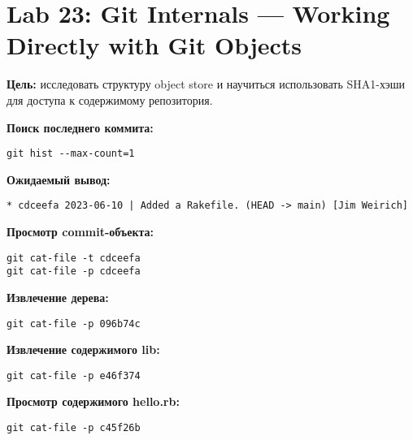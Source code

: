 \documentclass[a4paper,12pt]{report}
\begin{document}

\section{Lab 23: Git Internals — Working Directly with Git Objects}

\textbf{Цель:} исследовать структуру object store и научиться использовать SHA1-хэши для доступа к содержимому репозитория.

\textbf{Поиск последнего коммита:}
\begin{verbatim}
git hist --max-count=1
\end{verbatim}

\textbf{Ожидаемый вывод:}
\begin{verbatim}
* cdceefa 2023-06-10 | Added a Rakefile. (HEAD -> main) [Jim Weirich]
\end{verbatim}


\textbf{Просмотр commit-объекта:}
\begin{verbatim}
git cat-file -t cdceefa
git cat-file -p cdceefa
\end{verbatim}


\textbf{Извлечение дерева:}
\begin{verbatim}
git cat-file -p 096b74c
\end{verbatim}


\textbf{Извлечение содержимого lib:}
\begin{verbatim}
git cat-file -p e46f374
\end{verbatim}


\textbf{Просмотр содержимого hello.rb:}
\begin{verbatim}
git cat-file -p c45f26b
\end{verbatim}
\end{document}
